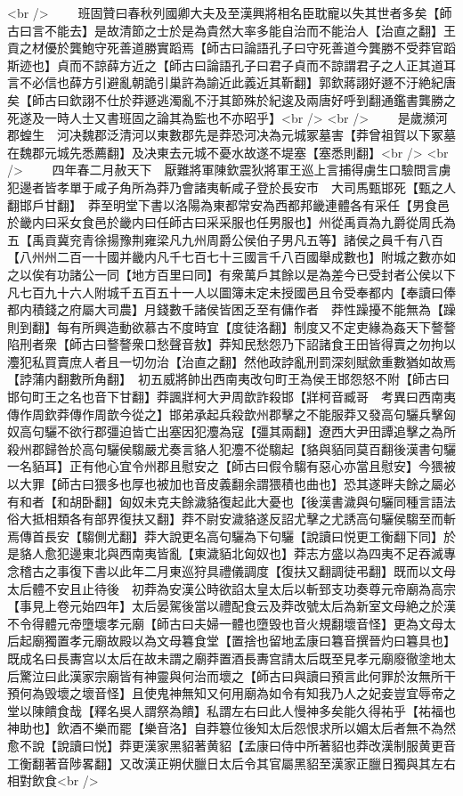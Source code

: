 <br />
　　班固贊曰春秋列國卿大夫及至漢興將相名臣耽寵以失其世者多矣【師古曰言不能去】是故清節之士於是為貴然大率多能自治而不能治人【治直之翻】王貢之材優於龔鮑守死善道勝實蹈焉【師古曰論語孔子曰守死善道今龔勝不受莽官蹈斯迹也】貞而不諒薛方近之【師古曰論語孔子曰君子貞而不諒謂君子之人正其道耳言不必信也薛方引避亂朝詭引巢許為諭近此義近其靳翻】郭欽蔣詡好遯不汙絶紀唐矣【師古曰欽詡不仕於莽遯逃濁亂不汙其節殊於紀逡及兩唐好呼到翻通鑑書龔勝之死遂及一時人士又書班固之論其為監也不亦昭乎】<br />
<br />
　　是歲瀕河郡蝗生　河决魏郡泛清河以東數郡先是莽恐河决為元城冢墓害【莽曾祖賀以下冢墓在魏郡元城先悉薦翻】及决東去元城不憂水故遂不堤塞【塞悉則翻】<br />
<br />
　　四年春二月赦天下　厭難將軍陳欽震狄將軍王巡上言捕得虜生口驗問言虜犯邊者皆孝單于咸子角所為莽乃會諸夷斬咸子登於長安市　大司馬甄邯死【甄之人翻邯戶甘翻】　莽至明堂下書以洛陽為東都常安為西都邦畿連體各有采任【男食邑於畿内曰采女食邑於畿内曰任師古曰采采服也任男服也】州從禹貢為九爵從周氏為五【禹貢冀兖青徐揚豫荆雍梁凡九州周爵公侯伯子男凡五等】諸侯之員千有八百【八州州二百一十國并畿内凡千七百七十三國言千八百國舉成數也】附城之數亦如之以俟有功諸公一同【地方百里曰同】有衆萬戶其餘以是為差今已受封者公侯以下凡七百九十六人附城千五百五十一人以圖簿未定未授國邑且令受奉都内【奉讀曰俸都内積錢之府屬大司農】月錢數千諸侯皆困乏至有傭作者　莽性躁擾不能無為【躁則到翻】每有所興造動欲慕古不度時宜【度徒洛翻】制度又不定吏緣為姦天下謷謷陷刑者衆【師古曰謷謷衆口愁聲音敖】莽知民愁怨乃下詔諸食王田皆得賣之勿拘以灋犯私買賣庶人者且一切勿治【治直之翻】然他政誖亂刑罰深刻賦歛重數猶如故焉【誖蒲内翻數所角翻】　初五威將帥出西南夷改句町王為侯王邯怨怒不附【師古曰邯句町王之名也音下甘翻】莽諷牂柯大尹周歆詐殺邯【牂柯音臧哥　考異曰西南夷傳作周欽莽傳作周歆今從之】邯弟承起兵殺歆州郡擊之不能服莽又發高句驪兵擊匈奴高句驪不欲行郡彊迫皆亡出塞因犯灋為寇【彊其兩翻】遼西大尹田譚追擊之為所殺州郡歸咎於高句驪侯騶嚴尤奏言貉人犯灋不從騶起【貉與貊同莫百翻後漢書句驪一名貊耳】正有他心宜令州郡且慰安之【師古曰假令騶有惡心亦當且慰安】今猥被以大罪【師古曰猥多也厚也被加也音皮義翻余謂猥積也曲也】恐其遂畔夫餘之屬必有和者【和胡卧翻】匈奴未克夫餘濊貉復起此大憂也【後漢書濊與句驪同種言語法俗大抵相類各有部界復扶又翻】莽不尉安濊貉遂反詔尤擊之尤誘高句驪侯騶至而斬焉傳首長安【騶側尤翻】莽大說更名高句驪為下句驪【說讀曰悦更工衡翻下同】於是貉人愈犯邊東北與西南夷皆亂【東濊貊北匈奴也】莽志方盛以為四夷不足吞滅專念稽古之事復下書以此年二月東巡狩具禮儀調度【復扶又翻調徒弔翻】既而以文母太后體不安且止待後　初莽為安漢公時欲諂太皇太后以斬郅支功奏尊元帝廟為高宗【事見上卷元始四年】太后晏駕後當以禮配食云及莽改號太后為新室文母絶之於漢不令得體元帝墮壞孝元廟【師古曰夫婦一體也墮毁也音火規翻壞音怪】更為文母太后起廟獨置孝元廟故殿以為文母篹食堂【置捨也留地孟康曰篹音撰晉灼曰篹具也】既成名曰長夀宫以太后在故未謂之廟莽置酒長夀宫請太后既至見孝元廟廢徹塗地太后驚泣曰此漢家宗廟皆有神靈與何治而壞之【師古曰與讀曰預言此何罪於汝無所干預何為毁壞之壞音怪】且使鬼神無知又何用廟為如令有知我乃人之妃妾豈宜辱帝之堂以陳饋食哉【釋名吳人謂祭為饋】私謂左右曰此人慢神多矣能久得祐乎【祐福也神助也】飲酒不樂而罷【樂音洛】自莽簒位後知太后怨恨求所以媚太后者無不為然愈不說【說讀曰悦】莽更漢家黑貂著黄貂【孟康曰侍中所著貂也莽改漢制服黄更音工衡翻著音陟畧翻】又改漢正朔伏臘日太后令其官屬黑貂至漢家正臘日獨與其左右相對飲食<br />

